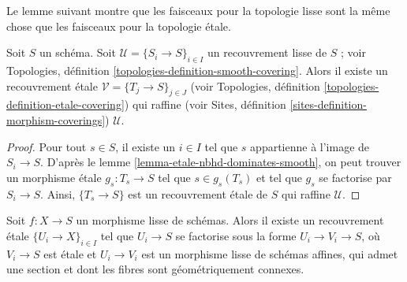 \noindent
Le lemme suivant montre que les faisceaux pour la topologie lisse sont
la même chose que les faisceaux pour la topologie \'etale.

\begin{lemma}
\label{lemma-etale-dominates-smooth}
Soit $S$ un schéma. Soit $\mathcal{U} = \{S_i \to S\}_{i \in I}$ un recouvrement
lisse de $S$ ; voir
Topologies, définition \ref{topologies-definition-smooth-covering}.
Alors il existe un recouvrement \'etale $\mathcal{V} = \{T_j \to S\}_{j \in J}$
(voir
Topologies, définition \ref{topologies-definition-etale-covering})
qui raffine (voir
Sites, définition \ref{sites-definition-morphism-coverings})
$\mathcal{U}$.
\end{lemma}

\begin{proof}
Pour tout $s \in S$, il existe un $i \in I$ tel que $s$ appartienne à
l'image de $S_i \to S$. D'après le
lemme \ref{lemma-etale-nbhd-dominates-smooth},
on peut trouver un morphisme \'etale $g_s : T_s \to S$ tel que $s \in g_s(T_s)$
et tel que $g_s$ se factorise par $S_i \to S$. Ainsi,
$\{T_s \to S\}$ est un recouvrement \'etale de $S$ qui raffine $\mathcal{U}$.
\end{proof}

\begin{lemma}
\label{lemma-cover-smooth-by-special}
Soit $f : X \to S$ un morphisme lisse de schémas. Alors il existe un
recouvrement \'etale $\{U_i \to X\}_{i \in I}$ tel que $U_i \to S$
se factorise sous la forme $U_i \to V_i \to S$, où $V_i \to S$ est \'etale et
$U_i \to V_i$ est un morphisme lisse de schémas affines, qui
admet une section et dont les fibres sont géométriquement connexes.
\end{lemma}

